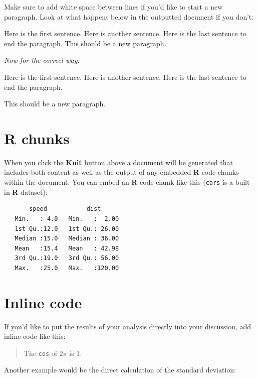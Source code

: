 \documentclass[12pt,twoside]{reedthesis}
\begin{document}
  Make sure to add white space between lines if you'd like to start a new
  paragraph. Look at what happens below in the outputted document if you
  don't:
  
  Here is the first sentence. Here is another sentence. Here is the last
  sentence to end the paragraph. This should be a new paragraph.
  
  \emph{Now for the correct way:}
  
  Here is the first sentence. Here is another sentence. Here is the last
  sentence to end the paragraph.
  
  This should be a new paragraph.
  
  \section{R chunks}\label{r-chunks}
  
  When you click the \textbf{Knit} button above a document will be
  generated that includes both content as well as the output of any
  embedded \textbf{R} code chunks within the document. You can embed an
  \textbf{R} code chunk like this (\texttt{cars} is a built-in \textbf{R}
  dataset):
  
  \begin{Shaded}
  \begin{Highlighting}[]
  \end{Highlighting}
  \end{Shaded}
  
  \begin{verbatim}
       speed           dist       
   Min.   : 4.0   Min.   :  2.00  
   1st Qu.:12.0   1st Qu.: 26.00  
   Median :15.0   Median : 36.00  
   Mean   :15.4   Mean   : 42.98  
   3rd Qu.:19.0   3rd Qu.: 56.00  
   Max.   :25.0   Max.   :120.00  
  \end{verbatim}
  
  \section{Inline code}\label{inline-code}
  
  If you'd like to put the results of your analysis directly into your
  discussion, add inline code like this:
  
  \begin{quote}
  The \texttt{cos} of \(2 \pi\) is 1.
  \end{quote}
  
  Another example would be the direct calculation of the standard
  deviation:
  
\end{document}
